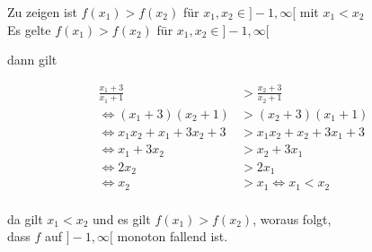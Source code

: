 \documentclass[a4paper, 11pt]{article}
\begin{document}
Zu zeigen ist \(f(x_1) > f(x_2)\) für \(x_1, x_2 \in ]-1, \infty[\) mit \(x_1 < x_2\) \\

Es gelte \(f(x_1) > f(x_2)\) für \(x_1, x_2 \in ]-1, \infty[\)

dann gilt

\begin{align*}
    \frac{x_1 + 3}{x_1 + 1} &> \frac{x_2 + 3}{x_2 + 1} \\
    \Leftrightarrow (x_1 + 3)(x_2 + 1) &> (x_2 + 3)(x_1 + 1) \\
    \Leftrightarrow x_1 x_2 + x_1 + 3 x_2 + 3 &> x_1 x_2 + x_2 + 3 x_1 + 3 \\
    \Leftrightarrow x_1 + 3 x_2 &> x_2 + 3 x_1 \\
    \Leftrightarrow 2 x_2 &> 2 x_1 \\
    \Leftrightarrow x_2 &> x_1 \Leftrightarrow x_1 < x_2 \\
\end{align*}

da gilt \(x_1 < x_2\) und es gilt \(f(x_1) > f(x_2)\), woraus folgt, \\
dass \(f\) auf \(]-1, \infty[\) monoton fallend ist.
\end{document}
